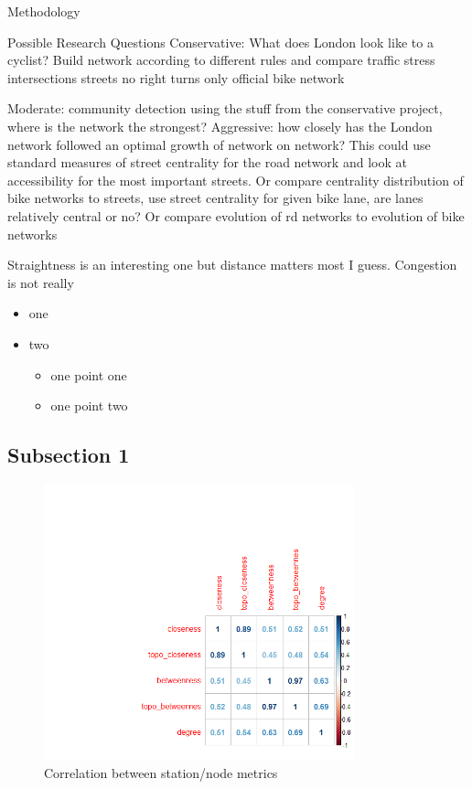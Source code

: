 \documentclass[11pt]{article} %
\begin{document}
	Methodology
	
	

Possible Research Questions
	Conservative: What does London look like to a cyclist? Build network according to different rules and compare
		traffic stress
			intersections
			streets
		no right turns
		only official bike network
		
		
	Moderate: community detection using the stuff from the conservative project, where is the network the strongest?
	Aggressive: how closely has the London network followed an optimal growth of network on network? 
		This could use standard measures of street centrality for the road network and look at accessibility for the most important streets. 
		Or compare centrality distribution of bike networks to streets, use street centrality for given bike lane, are lanes relatively central or no? 
		Or compare evolution of rd networks to evolution of bike networks
		
Straightness is an interesting one but distance matters most I guess. 
Congestion is not really 


	
	


\begin{itemize}
\item one
\item two
  \begin{itemize}
  \item one point one
  \item one point two
  \end{itemize}
\end{itemize}

\subsection{Subsection 1}

\begin{figure}
\centering
\includegraphics[width=0.8\textwidth]{example}
\caption{Correlation between station/node metrics}
\end{figure}
\end{document}
